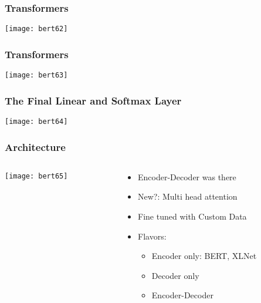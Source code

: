 \begin{frame}[fragile]\frametitle{Transformers}


			\begin{center}
			\texttt{[image: bert62]}
			\end{center}		

			
\end{frame}

\begin{frame}[fragile]\frametitle{Transformers}


			\begin{center}
			\texttt{[image: bert63]}
			\end{center}		

			
\end{frame}

\begin{frame}[fragile]\frametitle{The Final Linear and Softmax Layer}


			\begin{center}
			\texttt{[image: bert64]}
			\end{center}		

			
\end{frame}

\begin{frame}[fragile]\frametitle{Architecture}

\begin{columns}
    \begin{column}[T]{0.5\linewidth}
			\begin{center}
			\texttt{[image: bert65]}
			\end{center}		
		\end{column}
    \begin{column}[T]{0.5\linewidth}
      \begin{itemize}
			\item Encoder-Decoder was there
			\item New?: Multi head attention
			\item Fine tuned with Custom Data
			\item Flavors:
      \begin{itemize}
			\item Encoder only: BERT, XLNet
			\item Decoder only
			\item Encoder-Decoder
			\end{itemize}
			\end{itemize}
    \end{column}
  \end{columns}
			
\end{frame}

